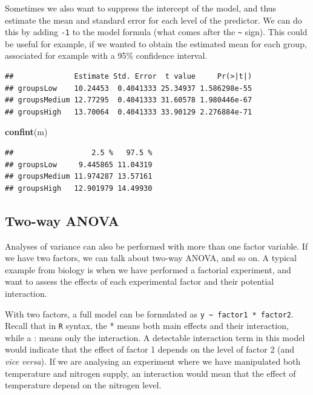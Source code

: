\documentclass[
]{article}
\newenvironment{Shaded}{\begin{snugshade}}{\end{snugshade}}
\newcommand{\DecValTok}[1]{\textcolor[rgb]{0.00,0.00,0.81}{#1}}
\newcommand{\FunctionTok}[1]{\textcolor[rgb]{0.13,0.29,0.53}{\textbf{#1}}}
\newcommand{\NormalTok}[1]{#1}
\newcommand{\OtherTok}[1]{\textcolor[rgb]{0.56,0.35,0.01}{#1}}
\newcommand{\SpecialCharTok}[1]{\textcolor[rgb]{0.81,0.36,0.00}{\textbf{#1}}}
\begin{document}
Sometimes we also want to suppress the intercept of the model, and thus
estimate the mean and standard error for each level of the predictor. We
can do this by adding \texttt{-1} to the model formula (what comes after
the \texttt{\textasciitilde{}} sign). This could be useful for example,
if we wanted to obtain the estimated mean for each group, associated for
example with a 95\% confidence interval.

\begin{Shaded}
\end{Shaded}

\begin{verbatim}
##              Estimate Std. Error  t value     Pr(>|t|)
## groupsLow    10.24453  0.4041333 25.34937 1.586298e-55
## groupsMedium 12.77295  0.4041333 31.60578 1.980446e-67
## groupsHigh   13.70064  0.4041333 33.90129 2.276884e-71
\end{verbatim}

\begin{Shaded}
\begin{Highlighting}[]
\FunctionTok{confint}\NormalTok{(m)}
\end{Highlighting}
\end{Shaded}

\begin{verbatim}
##                  2.5 %   97.5 %
## groupsLow     9.445865 11.04319
## groupsMedium 11.974287 13.57161
## groupsHigh   12.901979 14.49930
\end{verbatim}

\subsection{Two-way ANOVA}\label{two-way-anova}

Analyses of variance can also be performed with more than one factor
variable. If we have two factors, we can talk about two-way ANOVA, and
so on. A typical example from biology is when we have performed a
factorial experiment, and want to assess the effects of each
experimental factor and their potential interaction.

With two factors, a full model can be formulated as
\texttt{y\ \textasciitilde{}\ factor1\ *\ factor2}. Recall that in
\texttt{R} syntax, the * means both main effects and their interaction,
while a : means only the interaction. A detectable interaction term in
this model would indicate that the effect of factor 1 depends on the
level of factor 2 (and \emph{vice versa}). If we are analysing an
experiment where we have manipulated both temperature and nitrogen
supply, an interaction would mean that the effect of temperature depend
on the nitrogen level.
\end{document}
